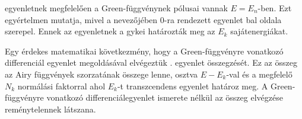  egyenletnek megfelelően a Green-függvénynek pólusai vannak $E=E_n$-ben. Ezt  egyértelmen mutatja, mivel a nevezőjében  $0$-ra rendezett egyenlet bal oldala szerepel. Ennek az egyenletnek a gykei határozták meg az $E_k$ sajátenergiákat.

Egy érdekes matematikai következmény, hogy a Green-függvényre vonatkozó differenciál egyenlet megoldásával elvégeztük . egyenlet összegzését. Ez az összeg az Airy függvények szorzatának összege lenne, osztva $E-E_k$-val és a megfelelő $N_k$ normálási faktorral ahol $E_k$-t  transzcendens egyenlet határoz meg. A Green-függvényre vonatkozó differenciálegyenlet ismerete nélkül az összeg elvégzése reménytelennek látszana.